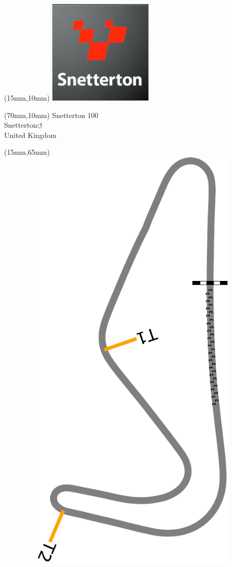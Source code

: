 \null\newpage
\begin{textblock*}{50mm}(15mm,10mm)%
\includegraphics[width=50mm]{LG/2015-05-20_00095.png}
\end{textblock*}
\begin{textblock*}{130mm}(70mm,10mm)%
{\fontsize{20}{20}\selectfont Snetterton 100\\}
{\fontsize{16}{16}\selectfont Snetterton\hfill \huge$\circlearrowleft$\\}
{\fontsize{12}{12}\selectfont United Kingdom\\}
\end{textblock*}
\begin{textblock*}{185mm}(15mm,65mm)%
\centering
\mbox{\includegraphics[width=185mm,height=210mm,keepaspectratio]{PT/SN100.pdf}}
\end{textblock*}
